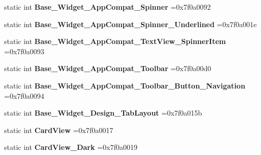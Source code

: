 \begin{DoxyCompactItemize}
static int {\bfseries Base\+\_\+\+Widget\+\_\+\+App\+Compat\+\_\+\+Spinner} =0x7f0a0092
\item 
\mbox{\label{classandroid_1_1support_1_1v7_1_1mediarouter_1_1R_1_1style_ae5df7c3ae626e55337462e9567404330}} 
static int {\bfseries Base\+\_\+\+Widget\+\_\+\+App\+Compat\+\_\+\+Spinner\+\_\+\+Underlined} =0x7f0a001e
\item 
\mbox{\label{classandroid_1_1support_1_1v7_1_1mediarouter_1_1R_1_1style_a3206eb187e502e2fed3a5550d8544339}} 
static int {\bfseries Base\+\_\+\+Widget\+\_\+\+App\+Compat\+\_\+\+Text\+View\+\_\+\+Spinner\+Item} =0x7f0a0093
\item 
\mbox{\label{classandroid_1_1support_1_1v7_1_1mediarouter_1_1R_1_1style_a2554b37a56252dd188dd03ed83489f4f}} 
static int {\bfseries Base\+\_\+\+Widget\+\_\+\+App\+Compat\+\_\+\+Toolbar} =0x7f0a00d0
\item 
\mbox{\label{classandroid_1_1support_1_1v7_1_1mediarouter_1_1R_1_1style_a9397610794c5e2b35562f426995ae36e}} 
static int {\bfseries Base\+\_\+\+Widget\+\_\+\+App\+Compat\+\_\+\+Toolbar\+\_\+\+Button\+\_\+\+Navigation} =0x7f0a0094
\item 
\mbox{\label{classandroid_1_1support_1_1v7_1_1mediarouter_1_1R_1_1style_a3a68062c11fc356506bbcdf6a2851d5b}} 
static int {\bfseries Base\+\_\+\+Widget\+\_\+\+Design\+\_\+\+Tab\+Layout} =0x7f0a015b
\item 
\mbox{\label{classandroid_1_1support_1_1v7_1_1mediarouter_1_1R_1_1style_a6a4006b988a9c004bd43a91d374eb63f}} 
static int {\bfseries Card\+View} =0x7f0a0017
\item 
\mbox{\label{classandroid_1_1support_1_1v7_1_1mediarouter_1_1R_1_1style_a9a6e8325f7785903dec2ee5ecb677fdd}} 
static int {\bfseries Card\+View\+\_\+\+Dark} =0x7f0a0019
\item 
\mbox{\label{classandroid_1_1support_1_1v7_1_1mediarouter_1_1R_1_1style_a4e065775e2ef299d19e8bcc02a3fd943}} 

\end{DoxyCompactItemize}
